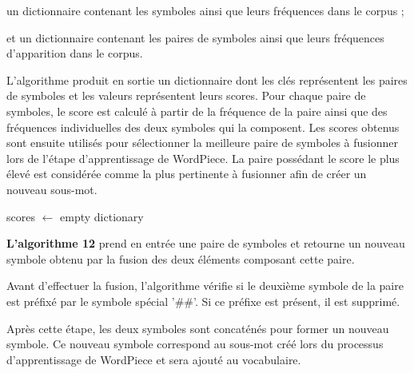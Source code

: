 \documentclass[12pt,a4paper]{report}
\begin{document}
	\begin{itemizeFB}
		\item un dictionnaire contenant les symboles ainsi que leurs fréquences dans le corpus ;
		\item et un dictionnaire contenant les paires de symboles ainsi que leurs fréquences d’apparition dans le corpus.
	\end{itemizeFB}
	
	L’algorithme produit en sortie un dictionnaire dont les clés représentent les paires de symboles et les valeurs représentent leurs scores. Pour chaque paire de symboles, le score est calculé à partir de la fréquence de la paire ainsi que des fréquences individuelles des deux symboles qui la composent. Les scores obtenus sont ensuite utilisés pour sélectionner la meilleure paire de symboles à fusionner lors de l’étape d’apprentissage de WordPiece. La paire possédant le score le plus élevé est considérée comme la plus pertinente à fusionner afin de créer un nouveau sous-mot.
	
	\begin{algorithm}[H]
		\caption{ComputeScores}
		
		
		scores $\leftarrow$ empty dictionary\;
		
		
		
	\end{algorithm}
	
	\vspace{0.5cm}
	
	\textbf{L’algorithme 12} prend en entrée une paire de symboles et retourne un nouveau symbole obtenu par la fusion des deux éléments composant cette paire.
	
	Avant d’effectuer la fusion, l’algorithme vérifie si le deuxième symbole de la paire est préfixé par le symbole spécial '\#\#'. Si ce préfixe est présent, il est supprimé.
	
	Après cette étape, les deux symboles sont concaténés pour former un nouveau symbole. Ce nouveau symbole correspond au sous-mot créé lors du processus d’apprentissage de WordPiece et sera ajouté au vocabulaire.
	
\end{document}
